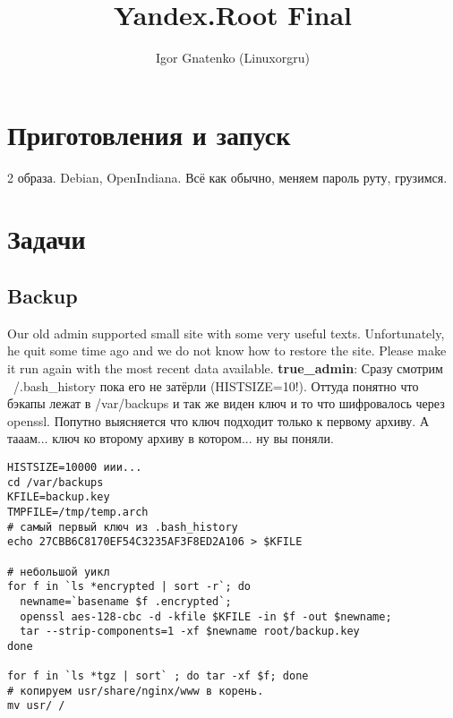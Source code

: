 \documentclass[a4paper,10pt]{report}
\title{Yandex.Root Final}
\author{Igor Gnatenko (Linuxorgru)}
\begin{document}
\maketitle
\tableofcontents

\begin{abstract}
\end{abstract}

\part{Приготовления и запуск}

2 образа. Debian, OpenIndiana. Всё как обычно, меняем пароль руту, грузимся.

\part{Задачи}

\chapter{Backup}
Our old admin supported small site with some very useful texts. Unfortunately, he quit some time ago and we do not know how to restore the site. Please make it run again with the most recent data available.
\newline\newline
\textbf{true\_admin}:
\newline
Сразу смотрим ~/.bash\_history пока его не затёрли (HISTSIZE=10!).
\newline
Оттуда понятно что бэкапы лежат в /var/backups и так же виден ключ и то что шифровалось через openssl.
Попутно выясняется что ключ подходит только к первому архиву. А тааам... ключ ко второму архиву в котором...
ну вы поняли.
\newline
\newline
\begin{verbatim}
HISTSIZE=10000 иии...
cd /var/backups
KFILE=backup.key
TMPFILE=/tmp/temp.arch
# самый первый ключ из .bash_history
echo 27CBB6C8170EF54C3235AF3F8ED2A106 > $KFILE

# небольшой уикл
for f in `ls *encrypted | sort -r`; do
  newname=`basename $f .encrypted`;
  openssl aes-128-cbc -d -kfile $KFILE -in $f -out $newname;
  tar --strip-components=1 -xf $newname root/backup.key
done

for f in `ls *tgz | sort` ; do tar -xf $f; done
# копируем usr/share/nginx/www в корень.
mv usr/ /
\end{verbatim}
\end{document}

